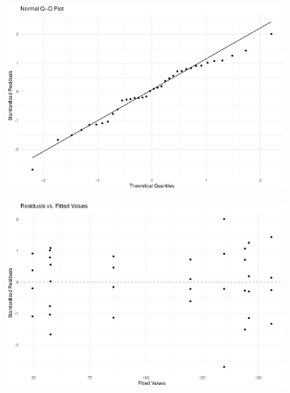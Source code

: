 \documentclass[
  letterpaper,
]{scrbook}
\begin{document}
\begin{figure}

\begin{minipage}{0.50\linewidth}

\begin{figure}[H]

{\centering \includegraphics{unit6-factorial/factorial_files/figure-pdf/plot-diagnostics-1.pdf}

}


\end{figure}%

\end{minipage}%
%
\begin{minipage}{0.50\linewidth}

\begin{figure}[H]

{\centering \includegraphics{unit6-factorial/factorial_files/figure-pdf/plot-diagnostics-2.pdf}

}


\end{figure}%

\end{minipage}%

\end{figure}%
\end{document}
